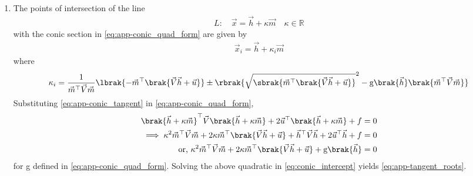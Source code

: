 \documentclass{article}
\numberwithin{equation}{section}
\numberwithin{figure}{section}
\begin{document}
\begin{enumerate}[label=\thesubsection.\arabic*.,ref=\thesubsection.\theenumi]
    and 
    \eqref{eq:conic_parab_c}
in Appendix  \ref{app:parab}.
 	\item
	 	\label{prop:chord}
  The points of intersection of the line 
\begin{align}
L: \quad \vec{x} = \vec{h} + \kappa \vec{m} \quad \kappa \in \mathbb{R}
\label{eq:app-conic_tangent}
\end{align}
with the conic section in \eqref{eq:app-conic_quad_form} are given by
\begin{align}
\vec{x}_i = \vec{h} + \kappa_i \vec{m}
	\label{eq:app-chord-pts}
\end{align}
%
where
\begin{multline}
\kappa_i = \frac{1}
{
\vec{m}^{\top}\vec{V}\vec{m}
}
\lbrak{-\vec{m}^{\top}\brak{\vec{V}\vec{h}+\vec{u}}}
\pm
\rbrak{\sqrt{
\sbrak{
\vec{m}^{\top}\brak{\vec{V}\vec{h}+\vec{u}}}
}^2
	-\text{g}
\brak
{\vec{h}
}
\brak{\vec{m}^{\top}\vec{V}\vec{m}}
}
\label{eq:app-tangent_roots}
\end{multline}
\solution
  Substituting \eqref{eq:app-conic_tangent}
in \eqref{eq:app-conic_quad_form}, 
\begin{align}
\brak{\vec{h} + \kappa \vec{m}}^{\top}\vec{V}\brak{\vec{h} + \kappa \vec{m}}  + 2 \vec{u}^{\top}\brak{\vec{h} + \kappa \vec{m}}+f &= 0
\\
\implies \kappa^2\vec{m}^{\top}\vec{V}\vec{m} + 2 \kappa\vec{m}^{\top}\brak{\vec{V}\vec{h}+\vec{u}} 
+ \vec{h}^{\top}\vec{V}\vec{h} + 2\vec{u}^{\top}\vec{h} +f &= 0
	\\
	\text{or, }
\kappa^2\vec{m}^{\top}\vec{V}\vec{m} + 2 \kappa\vec{m}^{\top}\brak{\vec{V}\vec{h}+\vec{u}} 
	+ \text{g}\brak{\vec{h}} &=0
\label{eq:conic_intercept}
\end{align}
for g defined in \eqref{eq:app-conic_quad_form}.
Solving the above quadratic in \eqref{eq:conic_intercept}
yields \eqref{eq:app-tangent_roots}.
		\end{enumerate}
\end{document}
